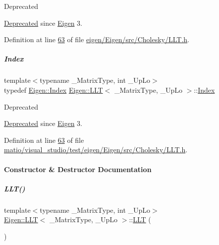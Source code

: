 \begin{DoxyRefDesc}{Deprecated}
\item[\hyperlink{deprecated__deprecated000002}{Deprecated}]since \hyperlink{namespace_eigen}{Eigen} 3. \end{DoxyRefDesc}


Definition at line \hyperlink{eigen_2_eigen_2src_2_cholesky_2_l_l_t_8h_source_l00063}{63} of file \hyperlink{eigen_2_eigen_2src_2_cholesky_2_l_l_t_8h_source}{eigen/\+Eigen/src/\+Cholesky/\+L\+L\+T.\+h}.

\mbox{\label{group___cholesky___module_ac7a64274814fa76e8b1e9e945546037f}} 
\subparagraph{\texorpdfstring{Index}{Index}\hspace{0.1cm}{\footnotesize\ttfamily [2/2]}}
{\footnotesize\ttfamily template$<$typename \+\_\+\+Matrix\+Type, int \+\_\+\+Up\+Lo$>$ \\
typedef \hyperlink{namespace_eigen_a62e77e0933482dafde8fe197d9a2cfde}{Eigen\+::\+Index} \hyperlink{group___cholesky___module_class_eigen_1_1_l_l_t}{Eigen\+::\+L\+LT}$<$ \+\_\+\+Matrix\+Type, \+\_\+\+Up\+Lo $>$\+::\hyperlink{group___cholesky___module_ac7a64274814fa76e8b1e9e945546037f}{Index}}

\begin{DoxyRefDesc}{Deprecated}
\item[\hyperlink{deprecated__deprecated000046}{Deprecated}]since \hyperlink{namespace_eigen}{Eigen} 3. \end{DoxyRefDesc}


Definition at line \hyperlink{matio_2visual__studio_2test_2eigen_2_eigen_2src_2_cholesky_2_l_l_t_8h_source_l00063}{63} of file \hyperlink{matio_2visual__studio_2test_2eigen_2_eigen_2src_2_cholesky_2_l_l_t_8h_source}{matio/visual\+\_\+studio/test/eigen/\+Eigen/src/\+Cholesky/\+L\+L\+T.\+h}.



\paragraph{Constructor \& Destructor Documentation}
\mbox{\label{group___cholesky___module_a16d1ec9ea6497ba1febb242c2e8a7a96}} 
\subparagraph{\texorpdfstring{L\+L\+T()}{LLT()}\hspace{0.1cm}{\footnotesize\ttfamily [1/6]}}
{\footnotesize\ttfamily template$<$typename \+\_\+\+Matrix\+Type, int \+\_\+\+Up\+Lo$>$ \\
\hyperlink{group___cholesky___module_class_eigen_1_1_l_l_t}{Eigen\+::\+L\+LT}$<$ \+\_\+\+Matrix\+Type, \+\_\+\+Up\+Lo $>$\+::\hyperlink{group___cholesky___module_class_eigen_1_1_l_l_t}{L\+LT} (\begin{DoxyParamCaption}{ }\end{DoxyParamCaption})\hspace{0.3cm}{\ttfamily [inline]}}



